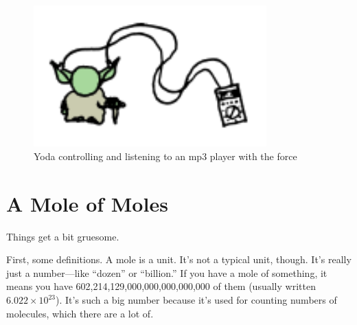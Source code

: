 \begin{figure}[!htbp]
\centering
\includegraphics[scale=0.5, max width=0.8\textwidth]{imgs/a/3/yoda_07.png}
\caption{Yoda controlling and listening to an mp3 player with the force}
\end{figure}

{
\chapter{A Mole of Moles}
}

\hfill{}

{Things get a bit gruesome.}

{First, some definitions. A mole is a unit. It’s not a typical unit, though. It’s really just a number—like “dozen” or “billion.” If you have a mole of something, it means you have 602,214,129,000,000,000,000,000 of them (usually written\( 6.022\times10^{23}\)). It’s such a big number because it’s used for counting numbers of molecules, which there are a lot of.}

